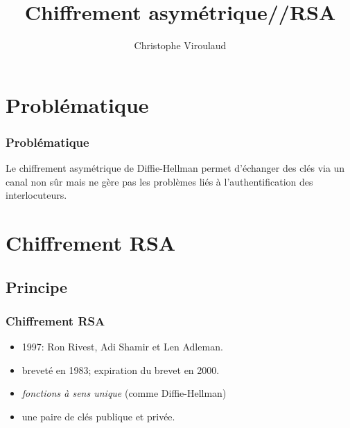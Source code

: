 \documentclass[svgnames,11pt]{beamer}
\author[]{Christophe Viroulaud}
\title{Chiffrement asymétrique//RSA}
\date{}
\institute{Terminale NSI}
\begin{document}
\begin{frame}
\titlepage
\end{frame}

\section{Problématique} 
\begin{frame}
    \frametitle{Problématique}

    Le chiffrement asymétrique de Diffie-Hellman permet d'échanger des clés via un canal non sûr mais ne gère pas les problèmes liés à l'authentification des interlocuteurs.
\begin{center}
\end{center}
\end{frame}

\section{Chiffrement RSA}
\subsection{Principe}
\begin{frame}
    \frametitle{Chiffrement RSA}
\begin{itemize}
    \item 1997: Ron Rivest, Adi Shamir et Len Adleman. 
    \item breveté en 1983; expiration du brevet en 2000.
    \item \emph{fonctions à sens unique} (comme Diffie-Hellman)
    \item une paire de clés publique et privée.

\end{itemize}  

\end{frame}
\end{document}
